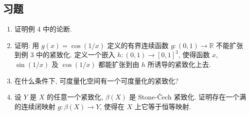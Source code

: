 \documentclass[../../main.tex]{subfiles}
\begin{document}
\subsection*{习题}

\begin{enumerate}
\item 证明例 4 中的论断.
\item 证明: 用 $g(x)=\cos(1/x)$ 定义的有界连续函数 $g\colon(0,1)\to\mathbb{R}$ 不能扩张到例 3 中的紧致化. 定义一个嵌入 $h\colon(0,1)\to[0,1]^3$, 使得函数 $x$, $\sin(1/x)$ 及 $\cos(1/x)$ 都能扩张到由 $h$ 所诱导的紧致化上去.
\item 在什么条件下, 可度量化空间有一个可度量化的紧致化?
\item 设 $Y$ 是 $X$ 的任意一个紧致化, $\beta(X)$ 是 Stone-Čech 紧致化. 证明存在一个满的连续闭映射 $g\colon\beta(X)\to Y$, 使得在 $X$ 上它等于恒等映射.


\end{enumerate}
\end{document}
